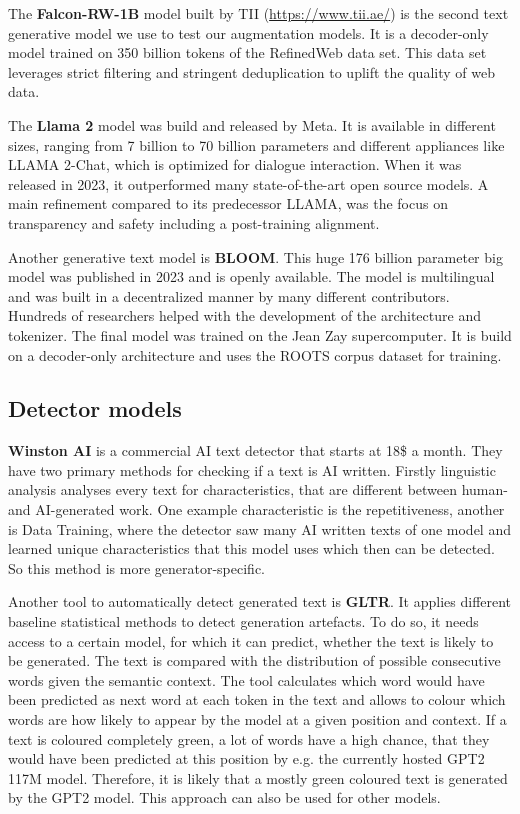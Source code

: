 \documentclass{article} %
\begin{document}
The \textbf{Falcon-RW-1B} model built by TII (\url{https://www.tii.ae/}) is the second text generative model we use to test our augmentation models. It is a decoder-only model trained on 350 billion tokens of the RefinedWeb data set. This data set leverages strict filtering and stringent deduplication to uplift the quality of web data. \cite{penedo2023refinedweb}

The \textbf{Llama 2} model was build and released by Meta. It is available in different sizes, ranging from 7 billion to 70 billion parameters and different appliances like LLAMA 2-Chat, which is optimized for dialogue interaction. When it was released in 2023, it outperformed many state-of-the-art open source models. A main refinement compared to its predecessor LLAMA, was the focus on transparency and safety including a post-training alignment. \cite{touvron2023llama}

Another generative text model is \textbf{BLOOM}. This huge 176 billion parameter big model was published in 2023 and is openly available. The model is multilingual and was built in a decentralized manner by many different contributors. Hundreds of researchers helped with the development of the architecture and tokenizer. The final model was trained on the Jean Zay supercomputer. It is build on a decoder-only architecture and uses the ROOTS corpus dataset for training. \cite{workshop2023bloom}

\subsection{Detector models}

\textbf{Winston AI} is a commercial AI text detector that starts at 18\$ a month. They have two primary methods for checking if a text is AI written. Firstly linguistic analysis analyses every text for characteristics, that are different between human- and AI-generated work. One example characteristic is the repetitiveness, another is Data Training, where the detector saw many AI written texts of one model and learned unique characteristics that this model uses which then can be detected. So this method is more generator-specific. \cite{WinstonAI}

Another tool to automatically detect generated text is \textbf{GLTR}. It applies different baseline statistical methods to detect generation artefacts. To do so, it needs access to a certain model, for which it can predict, whether the text is likely to be generated. The text is compared with the distribution of possible consecutive words given the semantic context. The tool calculates which word would have been predicted as next word at each token in the text and allows to colour which words are how likely to appear by the model at a given position and context. If a text is coloured completely green, a lot of words have a high chance, that they would have been predicted at this position by e.g. the currently hosted GPT2 117M model. Therefore, it is likely that a mostly green coloured text is generated by the GPT2 model. This approach can also be used for other models. \cite{gehrmann2019gltr}
\end{document}
